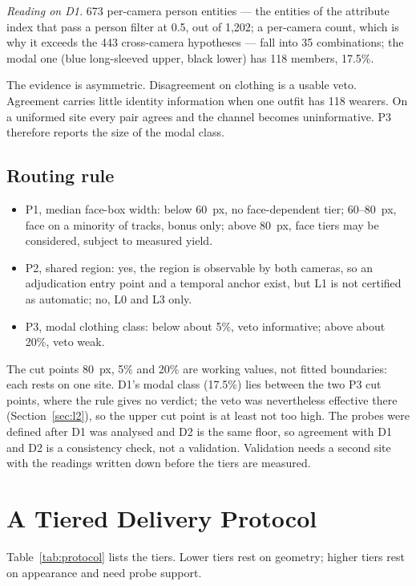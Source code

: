 \documentclass[journal]{IEEEtran}
\begin{document}
\emph{Reading on D1.} 673 per-camera person entities --- the entities of the attribute index that pass a person filter at 0.5, out of 1,202; a per-camera count, which is why it exceeds the 443 cross-camera hypotheses --- fall into 35 combinations; the modal one (blue long-sleeved upper, black lower) has 118 members, 17.5\%.

The evidence is asymmetric. Disagreement on clothing is a usable veto. Agreement carries little identity information when one outfit has 118 wearers. On a uniformed site every pair agrees and the channel becomes uninformative. P3 therefore reports the size of the modal class.

\subsection{Routing rule}
\begin{itemize}
\item P1, median face-box width: below 60~px, no face-dependent tier; 60--80~px, face on a minority of tracks, bonus only; above 80~px, face tiers may be considered, subject to measured yield.
\item P2, shared region: yes, the region is observable by both cameras, so an adjudication entry point and a temporal anchor exist, but L1 is not certified as automatic; no, L0 and L3 only.
\item P3, modal clothing class: below about 5\%, veto informative; above about 20\%, veto weak.
\end{itemize}

The cut points 80~px, 5\% and 20\% are working values, not fitted boundaries: each rests on one site. D1's modal class (17.5\%) lies between the two P3 cut points, where the rule gives no verdict; the veto was nevertheless effective there (Section~\ref{sec:l2}), so the upper cut point is at least not too high. The probes were defined after D1 was analysed and D2 is the same floor, so agreement with D1 and D2 is a consistency check, not a validation. Validation needs a second site with the readings written down before the tiers are measured.

\section{A Tiered Delivery Protocol}\label{sec:tiers}
Table~\ref{tab:protocol} lists the tiers. Lower tiers rest on geometry; higher tiers rest on appearance and need probe support.
\end{document}
